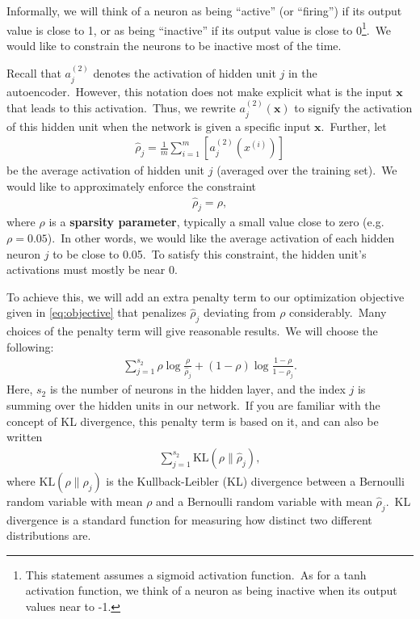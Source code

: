 Informally, we will think of a neuron as being ``active'' (or ``firing'') if its output value is close to 1, or as being ``inactive'' if its output value is close to 0\footnote{This statement assumes a sigmoid activation function.~As for a tanh activation function, we think of a neuron as being inactive when its output values near to -1.}.~We would like to constrain the neurons to be inactive most of the time.

Recall that $a_j^{(2)}$ denotes the activation of hidden unit $j$ in the autoencoder.~However, this notation does not make explicit what is the input $\bm{x}$ that leads to this activation.~Thus, we rewrite $a_j^{(2)}(\bm{x})$ to signify the activation of this hidden unit when the network is given a specific input $\bm{x}$.~Further, let
\begin{align}
	\hat{\rho}_j = \frac{1}{m} \sum_{i=1}^{m}[a_j^{(2)}(x^{(i)})]
\end{align}
be the average activation of hidden unit $j$ (averaged over the training set).~We would like to approximately enforce the constraint
\begin{align}
	\hat{\rho}_j = \rho,
\end{align}
where $\rho$ is a \textbf{sparsity parameter}, typically a small value close to zero (e.g. $\rho = 0.05$).~In other words, we would like the average activation of each hidden neuron $j$ to be close to 0.05.~To satisfy this constraint, the hidden unit's activations must mostly be near 0.

To achieve this, we will add an extra penalty term to our optimization objective given in \eqref{eq:objective} that penalizes $\hat{\rho}_j$ deviating from $\rho$ considerably.~Many choices of the penalty term will give reasonable results.~We will choose the following:
\begin{align}
	\sum_{j=1}^{s_2} \rho \log \frac{\rho}{\hat{\rho}_j} + (1 - \rho) \log \frac{1 - \rho}{1 - \hat{\rho}_j}.
\end{align}
Here, $s_2$ is the number of neurons in the hidden layer, and the index $j$ is summing over the hidden units in our network.~If you are familiar with the concept of KL divergence, this penalty term is based on it, and can also be written
\begin{align}
	\sum_{j=1}^{s_2} \text{KL} (\rho \parallel \hat{\rho}_j),
\end{align}
where $\text{KL} (\rho \parallel \hat{\rho}_j)$ is the Kullback-Leibler (KL) divergence between a Bernoulli random variable with mean $\rho$ and a Bernoulli random variable with mean $\hat{\rho}_j$.~KL divergence is a standard function for measuring how distinct two different distributions are.

